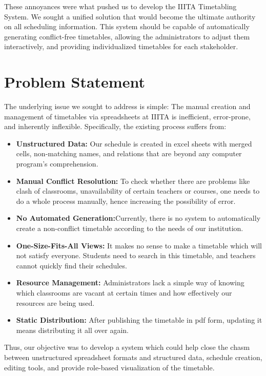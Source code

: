 These annoyances were what pushed us to develop the IIITA Timetabling System. We sought a unified solution that would become the ultimate authority on all scheduling information. This system should be capable of automatically generating conflict-free timetables, allowing the administrators to adjust them interactively, and providing individualized timetables for each stakeholder.


\section{Problem Statement}

The underlying issue we sought to address is simple: The manual creation and management of timetables via spreadsheets at IIITA is inefficient, error-prone, and inherently inflexible. Specifically, the existing process suffers from:

\begin{itemize}
    \item \textbf{Unstructured Data:} Our schedule is created in excel sheets with merged cells, non-matching names, and relations that are beyond any computer program’s comprehension.
    \item \textbf{Manual Conflict Resolution:} To check whether there are problems like clash of classrooms, unavailability of certain teachers or courses, one needs to do a whole process manually, hence increasing the possibility of error.
    \item \textbf{No Automated Generation:}Currently, there is no system to automatically create a non-conflict timetable according to the needs of our institution.
    \item \textbf{One-Size-Fits-All Views:} It makes no sense to make a timetable which will not satisfy everyone. Students need to search in this timetable, and teachers cannot quickly find their schedules.
    \item \textbf{Resource Management:} Administrators lack a simple way of knowing which classrooms are vacant at certain times and how effectively our resources are being used.
    \item \textbf{Static Distribution:} After publishing the timetable in pdf form, updating it means distributing it all over again.
\end{itemize}

Thus, our objective was to develop a system which could help close the chasm between unstructured spreadsheet formats and structured data, schedule creation, editing tools, and provide role-based visualization of the timetable.

